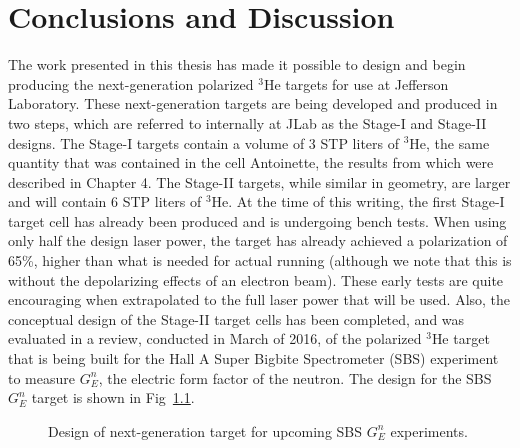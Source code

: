 \chapter{Conclusions and Discussion}
\label{conclutions}

The work presented in this thesis has made it possible to design and begin producing the next-generation polarized $^3$He targets for use at Jefferson Laboratory. These next-generation targets are being developed and produced in two steps, which are referred to internally at JLab as the Stage-I and Stage-II designs. The Stage-I targets contain a volume of 3 STP liters of $^3$He, the same quantity that was contained in the cell Antoinette, the results from which were described in Chapter 4. The Stage-II targets, while similar in geometry, are larger and will contain 6 STP liters of $^3$He. At the time of this writing, the first Stage-I target cell has already been produced and is undergoing bench tests. When using only half the design laser power, the target has already achieved a polarization of 65\%, higher than what is needed for actual running (although we note that this is without the depolarizing effects of an electron beam). These early tests are quite encouraging when extrapolated to the full laser power that
will be used. Also, the conceptual design of the Stage-II target cells has been 
completed, and was evaluated in a review, conducted in March of 2016, of the polarized $^3$He target that is being built for the Hall A Super Bigbite Spectrometer (SBS) experiment to measure $G_E^n$, the electric form factor of the neutron. The design for the SBS $G_E^n$ target is shown in Fig~\ref{Next_Gen_Design}.

\begin{figure}[t!]
	\centering
	\caption{{Design of next-generation target for upcoming SBS $G_E^n$ experiments.}}
	\label{Next_Gen_Design}
\end{figure}

